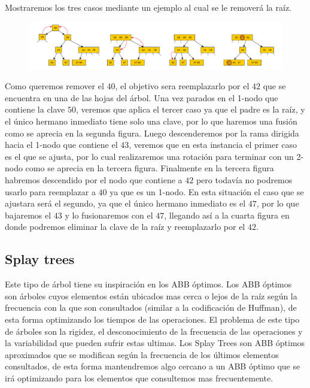 Mostraremos los tres casos mediante un ejemplo al cual se le remover\'a la ra\'iz.

\begin{figure}
 \centering
 \includegraphics[width=1\textwidth]{graficos/EliminacionArboles234.pdf}
\end{figure}

Como queremos remover el $40$, el objetivo sera reemplazarlo por el $42$ que se encuentra en una de las hojas del \'arbol. Una vez parados en el 1-nodo que contiene la clave $50$, veremos que aplica el tercer caso ya que el padre es la ra\'iz, y el \'unico hermano inmediato tiene solo una clave, por lo que haremos una fusi\'on como se aprecia en la segunda figura. Luego descenderemos por la rama dirigida hacia el 1-nodo que contiene el $43$, veremos que en esta instancia el primer caso es el que se ajusta, por lo cual realizaremos una rotaci\'on para terminar con un 2-nodo como se aprecia en la tercera figura. Finalmente en la tercera figura habremos descendido por el nodo que contiene a $42$ pero todav\'ia no podremos usarlo para reemplazar a $40$ ya que es un 1-nodo. En esta situaci\'on el caso que se ajustara ser\'a el segundo, ya que el \'unico hermano inmediato es el $47$, por lo que bajaremos el $43$ y lo fusionaremos con el $47$, llegando as\'i a la cuarta figura en donde podremos eliminar la clave de 
la ra\'iz y 
reemplazarlo por el $42$.

\subsection{Splay trees}

Este tipo de \'arbol tiene su inspiraci\'on en los ABB \'optimos. Los ABB \'optimos son \'arboles cuyos elementos est\'an ubicados mas cerca o lejos de la ra\'iz seg\'un la frecuencia con la que son consultados (similar a la codificaci\'on de Huffman), de esta forma optimizando los tiempos de las operaciones. El problema de este tipo de \'arboles son la rigidez, el desconocimiento de la frecuencia de las operaciones y la variabilidad que pueden sufrir estas ultimas. Los Splay Trees son ABB \'optimos aproximados que se modifican seg\'un la frecuencia de los \'ultimos elementos consultados, de esta forma mantendremos algo cercano a un ABB \'optimo que se ir\'a optimizando para los elementos que consultemos mas frecuentemente.

